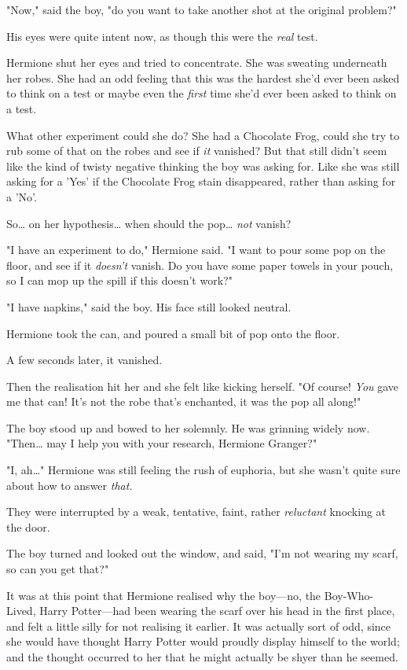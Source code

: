 "Now," said the boy, "do you want to take another shot at the original problem?"

His eyes were quite intent now, as though this were the \emph{real} test.

Hermione shut her eyes and tried to concentrate. She was sweating underneath 
her robes. She had an odd feeling that this was the hardest she'd ever been 
asked to think on a test or maybe even the \emph{first} time she'd ever been 
asked to think on a test.

What other experiment could she do? She had a Chocolate Frog, could she try to 
rub some of that on the robes and see if \emph{it} vanished? But that still 
didn't seem like the kind of twisty negative thinking the boy was asking for. 
Like she was still asking for a 'Yes' if the Chocolate Frog stain disappeared, 
rather than asking for a 'No'.

So{\ldots} on her hypothesis{\ldots} when should the pop{\ldots} \emph{not} 
vanish?

"I have an experiment to do," Hermione said. "I want to pour some pop on the 
floor, and see if it \emph{doesn't} vanish. Do you have some paper towels in 
your pouch, so I can mop up the spill if this doesn't work?"

"I have napkins," said the boy. His face still looked neutral.

Hermione took the can, and poured a small bit of pop onto the floor.

A few seconds later, it vanished.

Then the realisation hit her and she felt like kicking herself. "Of course! 
\emph{You} gave me that can! It's not the robe that's enchanted, it was the pop 
all along!"

The boy stood up and bowed to her solemnly. He was grinning widely now. 
"Then{\ldots} may I help you with your research, Hermione Granger?"

"I, ah{\ldots}" Hermione was still feeling the rush of euphoria, but she wasn't 
quite sure about how to answer \emph{that.}

They were interrupted by a weak, tentative, faint, rather \emph{reluctant} 
knocking at the door.

The boy turned and looked out the window, and said, "I'm not wearing my scarf, 
so can you get that?"

It was at this point that Hermione realised why the boy---no, the 
Boy-Who-Lived, Harry Potter---had been wearing the scarf over his head in the 
first place, and felt a little silly for not realising it earlier. It was 
actually sort of odd, since she would have thought Harry Potter would proudly 
display himself to the world; and the thought occurred to her that he might 
actually be shyer than he seemed.

